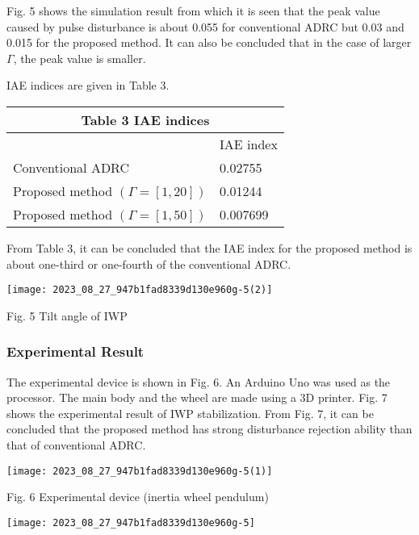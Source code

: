 \documentclass[10pt]{article}
\begin{document}
Fig. 5 shows the simulation result from which it is seen that the peak value caused by pulse disturbance is about 0.055 for conventional ADRC but 0.03 and 0.015 for the proposed method. It can also be concluded that in the case of larger $\Gamma$, the peak value is smaller.

IAE indices are given in Table 3.

\begin{center}
\begin{tabular}{ll}
\multicolumn{2}{c}{Table 3 IAE indices} \\
\hline
 & IAE index \\
\hline
Conventional ADRC & 0.02755 \\
Proposed method $(\Gamma=[1,20])$ & 0.01244 \\
Proposed method $(\Gamma=[1,50])$ & 0.007699 \\
\hline
\end{tabular}
\end{center}

From Table 3, it can be concluded that the IAE index for the proposed method is about one-third or one-fourth of the conventional ADRC.

\begin{center}
\texttt{[image: 2023\_08\_27\_947b1fad8339d130e960g-5(2)]}
\end{center}

Fig. 5 Tilt angle of IWP

\subsubsection{Experimental Result}
The experimental device is shown in Fig. 6. An Arduino Uno was used as the processor. The main body and the wheel are made using a 3D printer. Fig. 7 shows the experimental result of IWP stabilization. From Fig. 7, it can be concluded that the proposed method has strong disturbance rejection ability than that of conventional ADRC.

\begin{center}
\texttt{[image: 2023\_08\_27\_947b1fad8339d130e960g-5(1)]}
\end{center}

Fig. 6 Experimental device (inertia wheel pendulum)

\begin{center}
\texttt{[image: 2023\_08\_27\_947b1fad8339d130e960g-5]}
\end{center}
\end{document}
